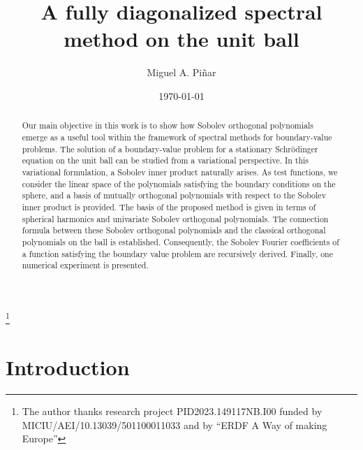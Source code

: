 \documentclass{amsart}
\theoremstyle{plain}%
\theoremstyle{definition}
\theoremstyle{remark}
\begin{document}
 
\title[A fully diagonalized spectral method on the unit ball]
{A fully diagonalized spectral method on the unit ball}

\author[M. A. Pi\~{n}ar]{Miguel A. Pi\~{n}ar}
\address[M. A. Pi\~{n}ar]{{Departamento de Matem\'atica Aplicada\\
Universidad de Granada\\
18071 Granada, Spain}}

\thanks{The author thanks research project PID2023.149117NB.I00  funded  by MICIU/AEI/10.13039/501100011033 and by ``ERDF A Way of making Europe”}


\date{\today}

\begin{abstract} 
Our main objective in this work is to show how Sobolev orthogonal polynomials emerge as a useful tool within the framework of spectral methods for boundary-value problems. The solution of a boundary-value problem for a stationary Schr\"odinger equation on the unit ball can be studied from a variational perspective. In this variational formulation, a Sobolev inner product naturally arises. As test functions, we consider the linear space of the polynomials satisfying the boundary conditions on the sphere, and a basis of mutually orthogonal polynomials with respect to the Sobolev inner product is provided. The basis of the proposed method is given in terms of spherical harmonics and univariate Sobolev orthogonal polynomials. The connection formula between these Sobolev orthogonal polynomials and the classical orthogonal polynomials on the ball is established. Consequently, the Sobolev Fourier coefficients of a function satisfying the boundary value problem are recursively derived. Finally, one numerical experiment is presented.
\end{abstract}

\maketitle

\section{Introduction}
\setcounter{equation}{0}
\end{document}
